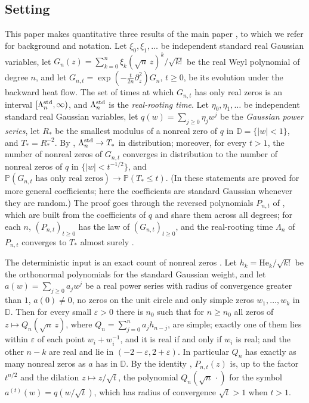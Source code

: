 \documentclass[11pt]{amsart}
\theoremstyle{definition}
\theoremstyle{remark}
\numberwithin{equation}{section}
\newcommand{\D}{\mathbb{D}}
\newcommand{\PP}{\mathbb{P}}
\newcommand{\eps}{\varepsilon}
\newcommand{\He}{\mathrm{He}}
\begin{document}
\subsection{Setting}
This paper makes quantitative three results of the main paper \cite{Main}, to which we refer for background and notation. Let $\xi_0,\xi_1,\dots$ be independent standard real Gaussian variables, let $G_n(z)=\sum_{k=0}^{n}\xi_k(\sqrt n\,z)^k/\sqrt{k!}$ be the real Weyl polynomial of degree $n$, and let $G_{n,t}=\exp(-\frac t{2n}\partial_z^2)G_n$, $t\ge0$, be its evolution under the backward heat flow. The set of times at which $G_{n,t}$ has only real zeros is an interval $[\Lambda_n^{\rm std},\infty)$, and $\Lambda_n^{\rm std}$ is the \emph{real-rooting time}. Let $\eta_0,\eta_1,\dots$ be independent standard real Gaussian variables, let $q(w)=\sum_{j\ge0}\eta_jw^j$ be the \emph{Gaussian power series}, let $R_*$ be the smallest modulus of a nonreal zero of $q$ in $\D=\{|w|<1\}$, and $T_*=R_*^{-2}$. By \cite[Theorem~\ref{M-cor:weyl}]{Main}, $\Lambda_n^{\rm std}\to T_*$ in distribution; moreover, for every $t>1$, the number of nonreal zeros of $G_{n,t}$ converges in distribution to the number of nonreal zeros of $q$ in $\{|w|<t^{-1/2}\}$, and $\PP(G_{n,t}\text{ has only real zeros})\to\PP(T_*\le t)$. (In \cite{Main} these statements are proved for more general coefficients; here the coefficients are standard Gaussian whenever they are random.) The proof goes through the reversed polynomials $P_{n,t}$ of \cite[\eqref{M-eq:reversed}]{Main}, which are built from the coefficients of $q$ and share them across all degrees; for each $n$, $(P_{n,t})_{t\ge0}$ has the law of $(G_{n,t})_{t\ge0}$, and the real-rooting time $\Lambda_n$ of $P_{n,t}$ converges to $T_*$ almost surely \cite[Theorem~\ref{M-thm:heat}]{Main}.

The deterministic input is an exact count of nonreal zeros \cite[Theorem~\ref{M-thm:main}]{Main}. Let $h_k=\He_k/\sqrt{k!}$ be the orthonormal polynomials for the standard Gaussian weight, and let $a(w)=\sum_{j\ge0}a_jw^j$ be a real power series with radius of convergence greater than $1$, $a(0)\ne0$, no zeros on the unit circle and only simple zeros $w_1,\dots,w_k$ in $\D$. Then for every small $\eps>0$ there is $n_0$ such that for $n\ge n_0$ all zeros of $z\mapsto Q_n(\sqrt n\,z)$, where $Q_n=\sum_{j=0}^{n}a_jh_{n-j}$, are simple; exactly one of them lies within $\eps$ of each point $w_i+w_i^{-1}$, and it is real if and only if $w_i$ is real; and the other $n-k$ are real and lie in $(-2-\eps,2+\eps)$. In particular $Q_n$ has exactly as many nonreal zeros as $a$ has in $\D$. By the identity \cite[\eqref{M-eq:heat-hermite}]{Main}, $P_{n,t}(z)$ is, up to the factor $t^{n/2}$ and the dilation $z\mapsto z/\sqrt t$, the polynomial $Q_n(\sqrt n\,\cdot)$ for the symbol $a^{(t)}(w)=q(w/\sqrt t)$, which has radius of convergence $\sqrt t>1$ when $t>1$.
\end{document}
